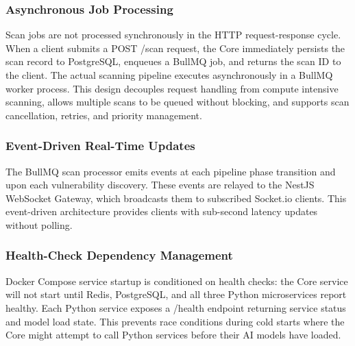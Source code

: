 \subsubsection{Asynchronous Job Processing}
Scan jobs are not processed synchronously in the HTTP request-response cycle. When a client submits a POST /scan request, the Core immediately persists the scan record to PostgreSQL, enqueues a BullMQ job, and returns the scan ID to the client. The actual scanning pipeline executes asynchronously in a BullMQ worker process. This design decouples request handling from compute intensive scanning, allows multiple scans to be queued without blocking, and supports scan cancellation, retries, and priority management.

\subsubsection{Event-Driven Real-Time Updates}

The BullMQ scan processor emits events at each pipeline phase transition and upon each vulnerability discovery. These events are relayed to the NestJS WebSocket Gateway, which broadcasts them to subscribed Socket.io clients. This event-driven architecture provides clients with sub-second latency updates without polling.

\subsubsection{Health-Check Dependency Management}

Docker Compose service startup is conditioned on health checks: the Core service will not start until Redis, PostgreSQL, and all three Python microservices report healthy. Each Python service exposes a /health endpoint returning service status and model load state. This prevents race conditions during cold starts where the Core might attempt to call Python services before their AI models have loaded.

